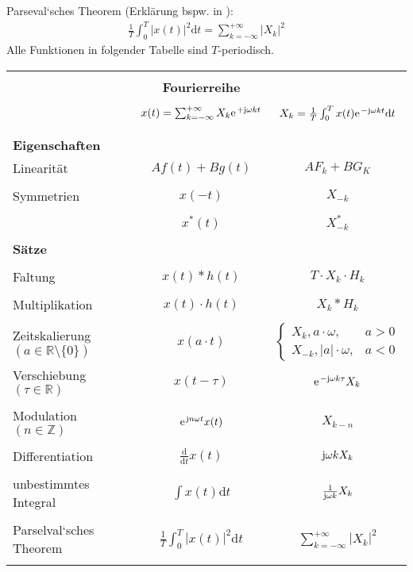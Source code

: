 \documentclass[11pt,a4paper,DIV=12]{scrartcl}
\begin{document}
Parseval`sches Theorem (Erklärung bspw. in \cite[Kap. 2, S. 27-28]{Meyer2017} ):
\begin{align}
	\frac{1}{T}\int_{0}^{T}\left|x(t)\right|^2\mathrm{d}t=\sum_{k=-\infty}^{+\infty}\left|X_k\right|^2
\end{align}
Alle Funktionen in folgender Tabelle sind $T$-periodisch.\\
\begin{tabular}{|lcc|}
	\hline
	&&\\
	&\textbf{Fourierreihe}& \\
	\hline
	&&\\
	& $x(t)=\sum_{k=-\infty}^{+\infty}X_k\e^{+\im\omega k t} $ & $X_k=\frac{1}{T}\int_0^Tx(t)\e^{-\im\omega k t}\mathrm{d}t $ \\&&\\
	\hline
	&&\\
	\textbf{Eigenschaften} & & \\
	Linearität & $Af(t)+Bg(t)$ & $AF_k+BG_K$\\&& \\
	Symmetrien & $x(-t)$ & $X_{-k}$ \\ &&\\
	& $x^*(t)$ & $X^*_{-k}$ \\ &&\\
	\hline
	\textbf{Sätze} & & \\&& \\
	Faltung & $x(t)\ast h(t)$ & $T\cdot X_k\cdot H_k$ \\&& \\
	Multiplikation & $x(t)\cdot h(t)$ & $X_k \ast H_k $ \\&& \\
	Zeitskalierung $(a\in\mathbb{R}\setminus\{0\})$& $x(a\cdot t)$ & $\begin{cases}
		X_k,a\cdot\omega, &a>0\\
		X_{-k},|a|\cdot\omega, &a<0
	\end{cases}$\\
	Verschiebung $(\tau \in \mathbb{R})$ & $x(t-\tau)$& $\e^{-\im\omega k \tau}X_k$\\&& \\
	Modulation $(n \in \mathbb{Z})$& $\e^{\im n \omega t}x(t)$ & $X_{k-n}$ \\&& \\
	Differentiation & $\frac{\mathrm{d}}{\mathrm{d}t}x(t)$ & $\im\omega k X_k$\\&& \\
	unbestimmtes Integral &$\int x(t)\mathrm{d}t $ & $\frac{1}{\im\omega k}X_k$\\&& \\
	Parselval`sches Theorem & $\frac{1}{T}\int_0^T|x(t)|^2\mathrm{d}t$ & $\sum_{k=-\infty}^{+\infty}|X_k|^2$\\&& \\
	\hline
\end{tabular}







\renewcommand{\refname}{Buchzitate}
\clearpage

\end{document}
